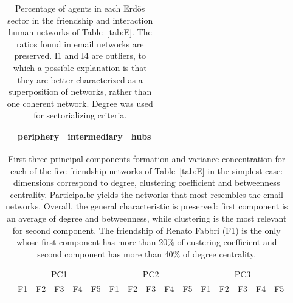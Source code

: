 \documentclass[%
 aip,
 jmp,%
 amsmath,amssymb,
 reprint,%
 floatfix,
]{revtex4-1}
\begin{document}
\begin{table}[!h]
	\caption{Percentage of agents in each Erd\"os sector in the friendship and interaction human networks of Table~\ref{tab:E}. The ratios found in email networks are preserved. I1 and I4 are outliers, to which a possible explanation is that they are better characterized as a superposition of networks, rather than one coherent network. Degree was used for sectorializing criteria.}
\begin{center}
\begin{tabular}{| l | c | c | c |}\hline
	 & periphery & intermediary & hubs \\ \hline\hline
	
\hline
\end{tabular}
\end{center}
\label{tab:secE}
\end{table}


\begin{table}[!h]
	\caption{First three principal components formation and variance concentration for each of the five friendship networks of Table~\ref{tab:E} in the simplest case: dimensions correspond to degree, clustering coefficient and betweenness centrality. Participa.br yields the networks that most resembles the email networks. Overall, the general characteristic is preserved: first component is an average of degree and betweenness, while clustering is the most relevant for second component. The friendship of Renato Fabbri (F1) is the only whose first component has more than 20\% of custering coefficient and second component has more than 40\% of degree centrality.}
	\footnotesize
\begin{center}
\begin{tabular}{| l ||  c |c |c |c |c || c | c | c | c | c || c |c |c |c |c |	}\cline{2-16}
\multicolumn{1}{c|}{} & \multicolumn{5}{c||}{PC1}          & \multicolumn{5}{c||}{PC2} & \multicolumn{5}{c|}{PC3}  \\\cline{2-16}
	\multicolumn{1}{c|}{} & 
	F1 & F2 & F3 & F4 & F5 &	
	F1 & F2 & F3 & F4 & F5 &	
	F1 & F2 & F3 & F4 & F5 	\\\hline
	
\hline
\end{tabular}
\end{center}
\label{tab:pcaE1F}
\end{table}
\end{document}
